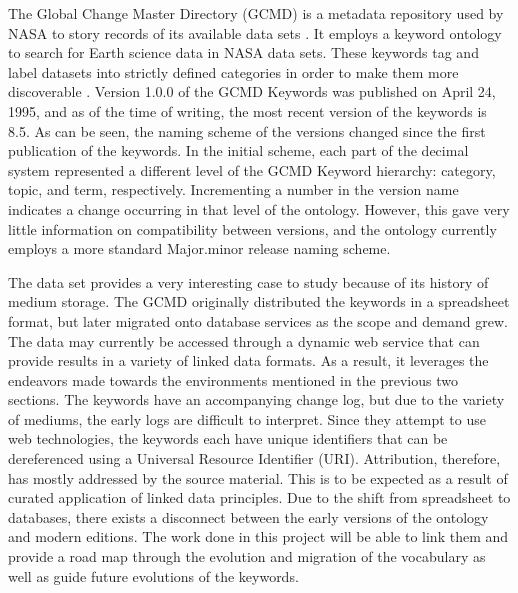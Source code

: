 The Global Change Master Directory (GCMD) is a metadata repository used by NASA to story records of its available data sets \cite{Miled:2001:GCM:372202.372324}.
It employs a keyword ontology to search for Earth science data in NASA data sets.
These keywords tag and label datasets into strictly defined categories in order to make them more discoverable \cite{GCMDKey}.
Version 1.0.0 of the GCMD Keywords was published on April 24, 1995, and as of the time of writing, the most recent version of the keywords is 8.5.
As can be seen, the naming scheme of the versions changed since the first publication of the keywords.
In the initial scheme, each part of the decimal system represented a different level of the GCMD Keyword hierarchy: category, topic, and term, respectively.
Incrementing a number in the version name indicates a change occurring in that level of the ontology.
However, this gave very little information on compatibility between versions, and the ontology currently employs a more standard Major.minor release naming scheme.

The data set provides a very interesting case to study because of its history of medium storage.
The GCMD originally distributed the keywords in a spreadsheet format, but later migrated onto database services as the scope and demand grew.
The data may currently be accessed through a dynamic web service that can provide results in a variety of linked data formats.
As a result, it leverages the endeavors made towards the environments mentioned in the previous two sections.
The keywords have an accompanying change log, but due to the variety of mediums, the early logs are difficult to interpret.
Since they attempt to use web technologies, the keywords each have unique identifiers that can be dereferenced using a Universal Resource Identifier (URI).
Attribution, therefore, has mostly addressed by the source material.
This is to be expected as a result of curated application of linked data principles.
Due to the shift from spreadsheet to databases, there exists a disconnect between the early versions of the ontology and modern editions.
The work done in this project will be able to link them and provide a road map through the evolution and migration of the vocabulary as well as guide future evolutions of the keywords.


